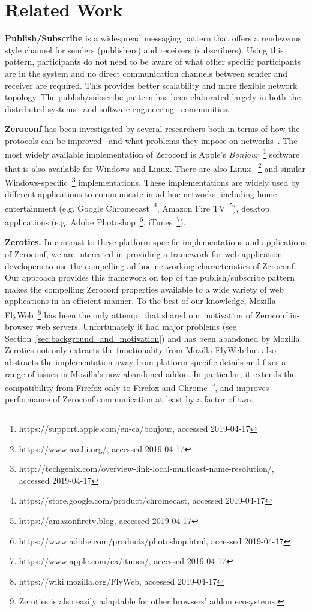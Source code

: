 \section{Related Work}
\label{sec:related_work}

\textbf{Publish/Subscribe} is a widespread messaging pattern that offers a rendezvous style channel for senders (publishers) and receivers (subscribers). 
Using this pattern, participants do not need to be aware of what other specific participants are in the system and no direct communication channels between sender and receiver are required.
This provides better scalability and more flexible network topology.
The publish/subscribe pattern has been elaborated largely in both the distributed systems~\cite{eugster_2003, banavar_1999, eugster_2000} and software engineering~\cite{carzaniga_1998, cugola_2001, filho_2005} communities.

\textbf{Zeroconf} has been investigated by several researchers both in terms of how the protocols can be improved~\cite{gunes_2002, bohnekamp_2003, jara_2012} and what problems they impose on networks~\cite{stolikj_2006, hong_2007}. The most widely available implementation of Zeroconf is Apple's \textit{Bonjour}~\footnote{https://support.apple.com/en-ca/bonjour, accessed 2019-04-17} software that is also available for Windows and Linux. There are also Linux-~\footnote{https://www.avahi.org/, accessed 2019-04-17} and similar Windows-specific~\footnote{http://techgenix.com/overview-link-local-multicast-name-resolution/, accessed 2019-04-17} implementations. These implementations are widely used by different applications to communicate in ad-hoc networks, including home entertainment (e.g. Google Chromecast~\footnote{https://store.google.com/product/chromecast, accessed 2019-04-17}, Amazon Fire TV~\footnote{https://amazonfiretv.blog, accessed 2019-04-17}), desktop applications (e.g. Adobe Photoshop~\footnote{https://www.adobe.com/products/photoshop.html, accessed 2019-04-17}, iTunes~\footnote{https://www.apple.com/ca/itunes/, accessed 2019-04-17}).

\textbf{Zeroties.} In contrast to these platform-specific implementations and applications of Zeroconf, we are interested in providing a framework for web application developers to use the compelling ad-hoc networking characteristics of Zeroconf.
Our approach provides this framework on top of the publish/subscribe pattern makes the compelling Zeroconf properties available to a wide variety of web applications in an efficient manner.
To the best of our knowledge, Mozilla FlyWeb~\footnote{https://wiki.mozilla.org/FlyWeb, accessed 2019-04-17} has been the only attempt that shared our motivation of Zeroconf in-browser web servers.
Unfortunately it had major problems (see Section~\ref{sec:background_and_motivation}) and has been abandoned by Mozilla.
Zeroties not only extracts the functionality from Mozilla FlyWeb but also abstracts the implementation away from platform-specific details and fixes a range of issues in Mozilla's now-abandoned addon.
In particular, it extends the compatibility from Firefox-only to Firefox and Chrome~\footnote{Zeroties is also easily adaptable for other browsers' addon ecosystems.}, and improves performance of Zeroconf communication at least by a factor of two.